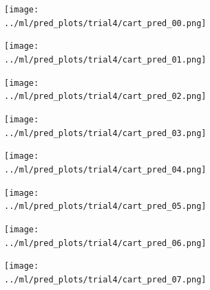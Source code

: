 \documentclass{beamer}
\newcommand{\mybox}[3]{{\color{#1}\framebox{\color{#2}#3}}}
\begin{document}
    \begin{frame}{\mybox{green}{blue}{Test Results}}
        \begin{figure}[h!]
            \centering
            \begin{subfigure}[t]{0.2\textwidth}
                \centering
                \texttt{[image: ../ml/pred\_plots/trial4/cart\_pred\_00.png]}
            \end{subfigure}%
            \hfill
            \centering
            \begin{subfigure}[t]{0.2\textwidth}
                \centering
                \texttt{[image: ../ml/pred\_plots/trial4/cart\_pred\_01.png]}
            \end{subfigure}%
            \hfill
            \centering
            \begin{subfigure}[t]{0.2\textwidth}
                \centering
                \texttt{[image: ../ml/pred\_plots/trial4/cart\_pred\_02.png]}
            \end{subfigure}%
            \hfill
            \centering
            \begin{subfigure}[t]{0.2\textwidth}
                \centering
                \texttt{[image: ../ml/pred\_plots/trial4/cart\_pred\_03.png]}
            \end{subfigure}%
            \hfill
            \begin{subfigure}[t]{0.2\textwidth}
                \centering
                \texttt{[image: ../ml/pred\_plots/trial4/cart\_pred\_04.png]}
            \end{subfigure}
            \vfill
            \begin{subfigure}[t]{0.2\textwidth}
                \centering
                \texttt{[image: ../ml/pred\_plots/trial4/cart\_pred\_05.png]}
            \end{subfigure}%
            \hfill
            \centering
            \begin{subfigure}[t]{0.2\textwidth}
                \centering
                \texttt{[image: ../ml/pred\_plots/trial4/cart\_pred\_06.png]}
            \end{subfigure}%
            \hfill
            \centering
            \begin{subfigure}[t]{0.2\textwidth}
                \centering
                \texttt{[image: ../ml/pred\_plots/trial4/cart\_pred\_07.png]}
            \end{subfigure}%

\end{figure}
\end{frame}
\end{document}
